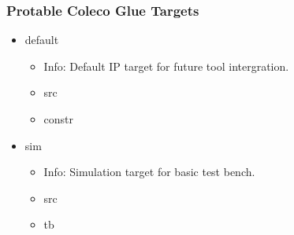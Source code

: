 \subsubsection{Protable Coleco Glue Targets}
\begin{itemize}
\item default
	\begin{itemize}
	\item[$\space$] Info: Default IP target for future tool intergration.
	\item src
	\item constr
	\end{itemize}
\item sim
	\begin{itemize}
	\item[$\space$] Info: Simulation target for basic test bench.
	\item src
	\item tb
	\end{itemize}
\end{itemize}
